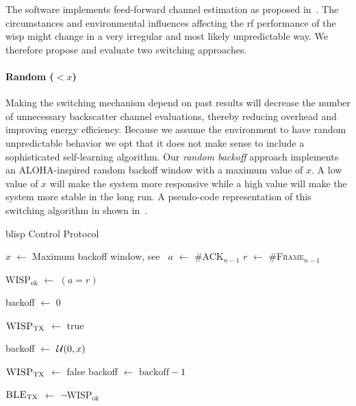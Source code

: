 \documentclass[conference,letterpaper,twoside,final,10pt]{IEEEtran}
\newcommand*\Let[2]{\State #1 $\gets$ #2}
\begin{document}
The software implements feed-forward channel estimation as proposed in~.
The circumstances and environmental influences affecting the \ac{rf} performance of the \ac{wisp} might change in a very irregular and most likely unpredictable way.
We therefore propose and evaluate two switching approaches.

\paragraph{Random ($<x$)}
\label{sec:software/random}

Making the switching mechanism depend on past results will decrease the number of unnecessary backscatter channel evaluations, thereby reducing overhead and improving energy efficiency.
Because we assume the environment to have random unpredictable behavior we opt that it does not make sense to include a sophisticated self-learning algorithm.
Our \emph{random backoff} approach implements an ALOHA-inspired random backoff window with a maximum value of $x$.
A low value of $x$ will make the system more responsive while a high value will make the system more stable in the long run.
A pseudo-code representation of this switching algorithm in shown in~.

\begin{algorithm}[tb]
	\caption{\acs{blisp} Control Protocol}
	\label{alg:blisp}
	{
		\fontsize{7}{10}\selectfont
		\begin{algorithmic}[1]
		\Let{$x$}{Maximum backoff window, see~}
			\Let{$a$}{\textsc{\#ACK$_{n-1}$}}
			\Let{$r$}{\textsc{\#Frame$_{n-1}$}}

			\Let{$\text{WISP}_\text{ok}$}{$\left( a = r \right)$}

				\Let{backoff}{$0$}
			\EndIf

				\Let{$\textsc{WISP}_\text{TX}$}{\textsf{true}}

					\Let{backoff}{$\Call{$\mathcal{U}$}{0, x}$}
				\EndIf

			\Else
				\Let{$\textsc{WISP}_\text{TX}$}{\textsf{false}}
				\Let{backoff}{$\text{backoff} - 1$}
			\EndIf

			\Let{$\textsc{BLE}_\text{TX}$}{$\neg \text{WISP}_\text{ok}$}
		\EndFor
		\end{algorithmic}
	}
\end{algorithm}
\end{document}
